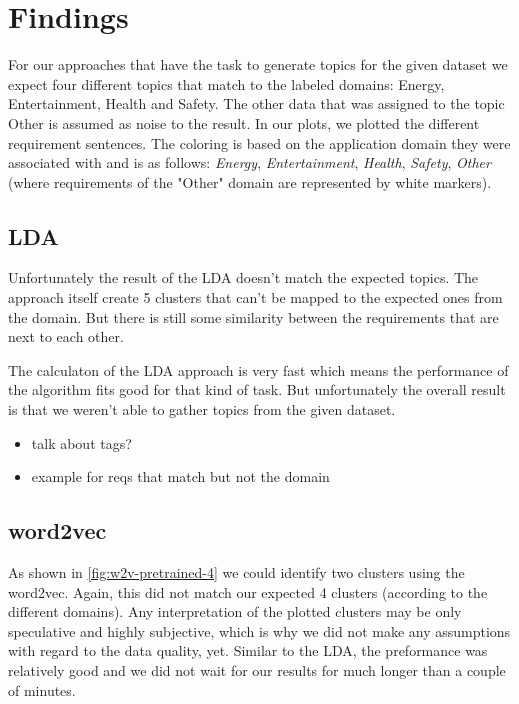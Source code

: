 \section{Findings} %
\label{sec:findings}

For our approaches that have the task to generate topics for the given dataset we expect four different topics that match to the labeled domains: Energy, Entertainment, Health and Safety. The other data that was assigned to the topic Other is assumed as noise to the result.
In our plots, we plotted the different requirement sentences. The coloring is based on the application domain they were associated with and is as follows: \textcolor{clr_energy}{\emph{Energy}}, \textcolor{clr_entertainment}{\emph{Entertainment}}, \textcolor{clr_health}{\emph{Health}}, \textcolor{clr_safety}{\emph{Safety}}, \emph{Other} (where requirements of the "Other" domain are represented by white markers).

\subsection{LDA} %
\label{sub:findings_lda}

Unfortunately the result of the LDA doesn't match the expected topics. The approach itself create 5 clusters that can't be mapped to the expected ones from the domain. But there is still some similarity between the requirements that are next to each other.

The calculaton of the LDA approach is very fast which means the performance of the algorithm fits good for that kind of task. But unfortunately the overall result is that we weren't able to gather topics from the given dataset.

\begin{itemize}
\item talk about tags?
\item example for reqs that match but not the domain
\end{itemize}

\subsection{word2vec} %
\label{sub:findings_w2v}
As shown in \autoref{fig:w2v-pretrained-4} we could identify two clusters using the word2vec. Again, this did not match our expected 4 clusters (according to the different domains). Any interpretation of the plotted clusters may be only speculative and highly subjective, which is why we did not make any assumptions with regard to the data quality, yet.
Similar to the LDA, the preformance was relatively good and we did not wait for our results for much longer than a couple of minutes.

